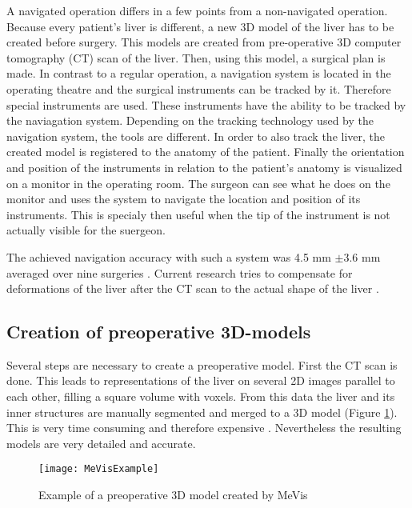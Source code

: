 A navigated operation differs in a few points from a non-navigated operation.
Because every patient's liver is different, a new 3D model of the liver has to
be created before surgery. This models are created from pre-operative 3D
computer tomography (CT) scan of the liver. Then, using this model, a surgical plan is made.
In contrast to a regular operation, a navigation system is located in the
operating theatre and the surgical instruments can be tracked by it. Therefore special instruments are used. These
instruments have the ability to be tracked by the naviagation system. Depending
on the tracking technology used by the navigation system, the tools are different.
In order to also track the liver, the created model is registered to the anatomy
of the patient. Finally the orientation and position
of the instruments in relation to the patient's anatomy is visualized on a
monitor in the operating room. The surgeon can see what he does on the
monitor and uses the system to navigate the location and position of its
instruments. This is specialy then useful when the tip of the instrument is not
actually visible for the suergeon.

The achieved
navigation accuracy with such a system was 4.5 mm $\pm$3.6 mm averaged over nine surgeries \cite{peterhans2011navigation}.
Current research tries to compensate for deformations of the liver after the CT
scan to the actual shape of the liver \cite{clements2017deformation}
\cite{clements2015validation}. 
\subsection{Creation of preoperative 3D-models}
Several steps are necessary to create a preoperative model. First the 
CT scan is done. This leads to representations of the liver on several 2D images parallel
to each other, filling a square volume with voxels. From this data the liver and
its inner structures are manually segmented and merged to a 3D model (Figure \ref{fig:MeVisExample}). This is very
time consuming and therefore expensive \cite{numminen2005preoperative}.
Nevertheless the resulting models are very detailed and accurate.
\begin{figure}[H]
  \centering
 \texttt{[image: MeVisExample]}
 \caption{Example of a preoperative 3D model created by MeVis}%
  \label{fig:MeVisExample}
\end{figure}

